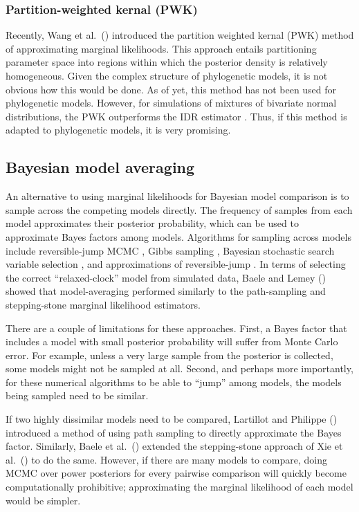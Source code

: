 \subsubsection{Partition-weighted kernal (PWK)}
Recently, Wang et al.\ (\citeyear{Wang2017}) introduced the partition weighted
kernal (PWK) method of approximating marginal likelihoods.
This approach entails partitioning parameter space into regions within which
the posterior density is relatively homogeneous.
Given the complex structure of phylogenetic models, it is not obvious how this
would be done.
As of yet, this method has not been used for phylogenetic models.
However, for simulations of mixtures of bivariate normal distributions, the
PWK outperforms the IDR estimator \citep{Wang2017}.
Thus, if this method is adapted to phylogenetic models, it is very promising.


\subsection{Bayesian model averaging}

An alternative to using marginal likelihoods for Bayesian model comparison is
to sample across the competing models directly.
The frequency of samples from each model approximates their posterior
probability, which can be used to approximate Bayes factors among models.
Algorithms for sampling across models include reversible-jump MCMC
\citep{Green1995}, Gibbs sampling \citep{Neal2000}, Bayesian stochastic search
variable selection \citep{George1993,Kuo1998}, and approximations of reversible-jump
\citep{Jones2015}.
In terms of selecting the correct ``relaxed-clock'' model from simulated data,
Baele and Lemey (\citeyear{Baele2014}) showed that model-averaging performed
similarly to the path-sampling and stepping-stone marginal likelihood
estimators.

There are a couple of limitations for these approaches.
First, a Bayes factor that includes a model with small posterior probability
will suffer from Monte Carlo error.
For example, unless a very large sample from the posterior is collected, some
models might not be sampled at all.
Second, and perhaps more importantly, for these numerical algorithms to be able
to ``jump'' among models, the models being sampled need to be similar.

If two highly dissimilar models need to be compared,
Lartillot and Philippe (\citeyear{Lartillot2006}) introduced a method of using
path sampling to directly approximate the Bayes factor.
Similarly, Baele et al.\ (\citeyear{Baele2013}) extended the stepping-stone
approach of Xie et al.\ (\citeyear{Xie2011}) to do the same.
However, if there are many models to compare, doing MCMC over power posteriors
for every pairwise comparison will quickly become computationally prohibitive;
approximating the marginal likelihood of each model would be simpler.


